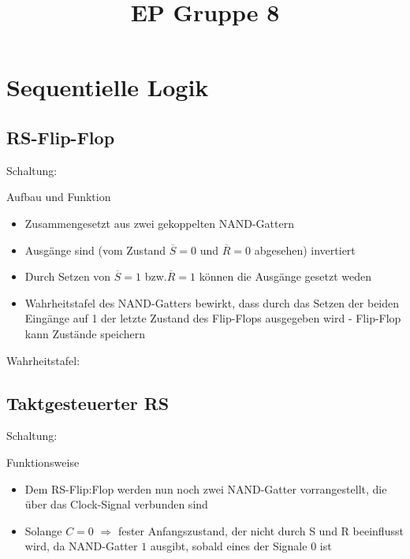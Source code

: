 \documentclass[compress,11pt]{beamer}
\title{EP Gruppe 8}
\begin{document}
\section{Sequentielle Logik}
\subsection{RS-Flip-Flop}
\begin{frame}
Schaltung:





\end{frame}
\begin{frame}

\begin{block}{Aufbau und Funktion}
\begin{itemize}
\item Zusammengesetzt aus zwei gekoppelten NAND-Gattern
\item Ausgänge sind (vom Zustand $\overline{S} = 0$ und $\overline{R} = 0$ abgesehen) invertiert
\item Durch Setzen von $\overline{S} = 1$ bzw.$\overline{R} = 1$ können die Ausgänge gesetzt weden
\item Wahrheitstafel des NAND-Gatters bewirkt, dass durch das Setzen der beiden Eingänge auf 1 der letzte Zustand des Flip-Flops ausgegeben wird - Flip-Flop kann Zustände speichern
\end{itemize}
\end{block}
\end{frame}

\begin{frame}
Wahrheitstafel:\\





\end{frame}
\subsection{Taktgesteuerter RS}
\begin{frame}
Schaltung:\\




\end{frame}
\begin{frame}
\begin{block}{Funktionsweise}
\begin{itemize}
\item Dem RS-Flip:Flop werden nun noch zwei NAND-Gatter vorrangestellt, die über das Clock-Signal verbunden sind
\item Solange $C = 0$ $\Rightarrow$ fester Anfangszustand, der nicht durch S und R beeinflusst wird, da NAND-Gatter $1$ ausgibt, sobald eines der Signale $0$ ist

\end{itemize}
\end{block}
\end{frame}
\begin{frame}

\end{frame}
\end{document}
